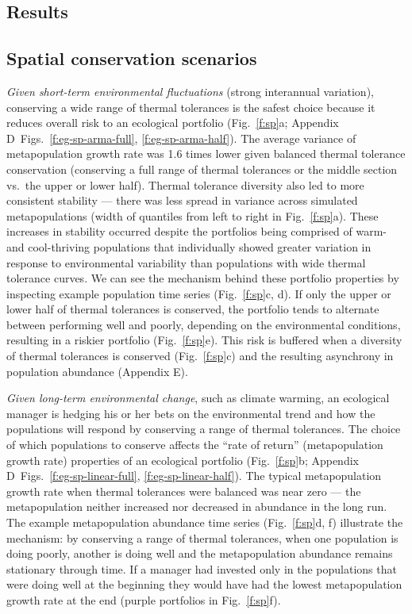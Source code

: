 \documentclass[12pt,english]{article}
\newcommand{\somts}{Appendix D}
\newcommand{\somcor}{Appendix E}
\begin{document}
\begin{spacing}{1.3}
\section{Results}\label{results}

\subsection{Spatial conservation scenarios}\label{spatial-conservation-scenarios}

\emph{Given short-term environmental fluctuations} (strong interannual variation), conserving a wide range of thermal tolerances is the safest choice because it reduces overall risk to an ecological portfolio (Fig.~\ref{f:sp}a; \somts~Figs.~\ref{f:eg-sp-arma-full}, \ref{f:eg-sp-arma-half}). The average variance of metapopulation growth rate was 1.6 times lower given balanced thermal tolerance conservation (conserving a full range of thermal tolerances or the middle section vs.~the upper or lower half). Thermal tolerance diversity also led to more consistent stability --- there was less spread in variance across simulated metapopulations (width of quantiles from left to right in Fig.~\ref{f:sp}a). These increases in stability occurred despite the portfolios being comprised of warm- and cool-thriving populations that individually showed greater variation in response to environmental variability than populations with wide thermal tolerance curves. We can see the mechanism behind these portfolio properties by inspecting example population time series (Fig.~\ref{f:sp}c, d). If only the upper or lower half of thermal tolerances is conserved, the portfolio tends to alternate between performing well and poorly, depending on the environmental conditions, resulting in a riskier portfolio (Fig.~\ref{f:sp}e). This risk is buffered when a diversity of thermal tolerances is conserved (Fig.~\ref{f:sp}c) and the resulting asynchrony in population abundance (\somcor).

\emph{Given long-term environmental change}, such as climate warming, an ecological manager is hedging his or her bets on the environmental trend and how the populations will respond by conserving a range of thermal tolerances. The choice of which populations to conserve affects the ``rate of return'' (metapopulation growth rate) properties of an ecological portfolio (Fig.~\ref{f:sp}b; \somts~Figs.~\ref{f:eg-sp-linear-full}, \ref{f:eg-sp-linear-half}). The typical metapopulation growth rate when thermal tolerances were balanced was near zero --- the metapopulation neither increased nor decreased in abundance in the long run. The example metapopulation abundance time series (Fig.~\ref{f:sp}d, f) illustrate the mechanism: by conserving a range of thermal tolerances, when one population is doing poorly, another is doing well and the metapopulation abundance remains stationary through time. If a manager had invested only in the populations that were doing well at the beginning they would have had the lowest metapopulation growth rate at the end (purple portfolios in Fig.~\ref{f:sp}f).


\end{spacing}
\end{document}
